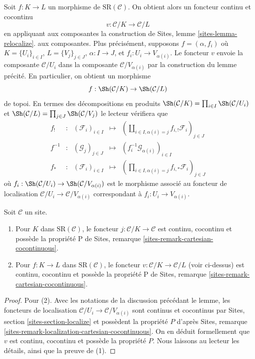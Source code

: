 \medskip\noindent
Soit $f : K \to L$ un morphisme de $\text{SR}(\mathcal{C})$.
On obtient alors un foncteur continu et cocontinu
$$
v : \mathcal{C}/K \longrightarrow \mathcal{C}/L
$$
en appliquant aux composantes la construction de Sites, lemme \ref{sites-lemma-relocalize}.
aux composantes. Plus précisément, supposons $f = (\alpha, f_i)$
où $K = \{U_i\}_{i \in I}$, $L = \{V_j\}_{j \in J}$, $\alpha : I \to J$,
et $f_i : U_i \to V_{\alpha(i)}$. Le foncteur $v$ envoie la composante
$\mathcal{C}/U_i$ dans la composante $\mathcal{C}/V_{\alpha(i)}$
par la construction du lemme précité. En particulier,
on obtient un morphisme
$$
f : \Sh(\mathcal{C}/K) \to \Sh(\mathcal{C}/L)
$$
de topoi. En termes des décompositions en produits
$\Sh(\mathcal{C}/K) = \prod\nolimits_{i \in I} \Sh(\mathcal{C}/U_i)$ et
$\Sh(\mathcal{C}/L) = \prod\nolimits_{j \in J} \Sh(\mathcal{C}/V_j)$
le lecteur vérifiera que
$$
\begin{matrix}
f_! & : &
(\mathcal{F}_i)_{i \in I} &
\longmapsto &
(\coprod\nolimits_{i \in I, \alpha(i) = j} f_{i, !}\mathcal{F}_i)_{j \in J} \\
f^{-1} & : &
(\mathcal{G}_j)_{j \in J} &
\longmapsto &
(f_i^{-1}\mathcal{G}_{\alpha(i)})_{i \in I} \\
f_* & : &
(\mathcal{F}_i)_{i \in I} &
\longmapsto &
(\prod\nolimits_{i \in I, \alpha(i) = j} f_{i, *}\mathcal{F}_i)_{j \in J}
\end{matrix}
$$
où $f_i : \Sh(\mathcal{C}/U_i) \to \Sh(\mathcal{C}/V_{\alpha(i)})$
est le morphisme associé au foncteur de localisation
$\mathcal{C}/U_i \to \mathcal{C}/V_{\alpha(i)}$ correspondant à
$f_i : U_i \to V_{\alpha(i)}$.

\begin{lemma}
\label{lemma-has-P}
Soit $\mathcal{C}$ un site.
\begin{enumerate}
\item Pour $K$ dans $\text{SR}(\mathcal{C})$, le foncteur
$j : \mathcal{C}/K \to \mathcal{C}$ est continu,
cocontinu et possède la propriété P de
Sites, remarque \ref{sites-remark-cartesian-cocontinuous}.
\item Pour $f : K \to L$ dans $\text{SR}(\mathcal{C})$,
le foncteur $v : \mathcal{C}/K \to \mathcal{C}/L$ (voir ci-dessus)
est continu, cocontinu et possède la propriété P de
Sites, remarque \ref{sites-remark-cartesian-cocontinuous}.
\end{enumerate}
\end{lemma}

\begin{proof}
Pour (2). Avec les notations de la discussion précédant le lemme,
les foncteurs de localisation $\mathcal{C}/U_i \to \mathcal{C}/V_{\alpha(i)}$
sont continus et cocontinus par
Sites, section \ref{sites-section-localize}
et possèdent la propriété $P$ d'après
Sites, remarque \ref{sites-remark-localization-cartesian-cocontinuous}.
On en déduit formellement que $v$ est continu, cocontinu et possède la propriété $P$.
Nous laissons au lecteur les détails, ainsi que la preuve de (1).
\end{proof}

